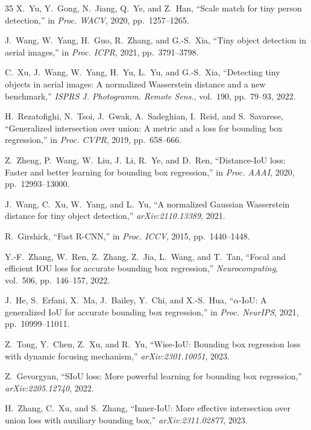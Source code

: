 \documentclass[11pt,a4paper]{article}
\begin{document}
\begin{thebibliography}{35}
  \small
  X.~Yu, Y.~Gong, N.~Jiang, Q.~Ye, and Z.~Han, ``Scale match for tiny person detection,'' in \emph{Proc. WACV}, 2020, pp.~1257--1265.

  J.~Wang, W.~Yang, H.~Guo, R.~Zhang, and G.-S.~Xia, ``Tiny object detection in aerial images,'' in \emph{Proc. ICPR}, 2021, pp.~3791--3798.

  C.~Xu, J.~Wang, W.~Yang, H.~Yu, L.~Yu, and G.-S.~Xia, ``Detecting tiny objects in aerial images: A normalized Wasserstein distance and a new benchmark,'' \emph{ISPRS J. Photogramm. Remote Sens.}, vol.~190, pp.~79--93, 2022.

  H.~Rezatofighi, N.~Tsoi, J.~Gwak, A.~Sadeghian, I.~Reid, and S.~Savarese, ``Generalized intersection over union: A metric and a loss for bounding box regression,'' in \emph{Proc. CVPR}, 2019, pp.~658--666.

  Z.~Zheng, P.~Wang, W.~Liu, J.~Li, R.~Ye, and D.~Ren, ``Distance-IoU loss: Faster and better learning for bounding box regression,'' in \emph{Proc. AAAI}, 2020, pp.~12993--13000.

  J.~Wang, C.~Xu, W.~Yang, and L.~Yu, ``A normalized Gaussian Wasserstein distance for tiny object detection,'' \emph{arXiv:2110.13389}, 2021.

  R.~Girshick, ``Fast R-CNN,'' in \emph{Proc. ICCV}, 2015, pp.~1440--1448.

  Y.-F.~Zhang, W.~Ren, Z.~Zhang, Z.~Jia, L.~Wang, and T.~Tan, ``Focal and efficient IOU loss for accurate bounding box regression,'' \emph{Neurocomputing}, vol.~506, pp.~146--157, 2022.

  J.~He, S.~Erfani, X.~Ma, J.~Bailey, Y.~Chi, and X.-S.~Hua, ``$\alpha$-IoU: A generalized IoU for accurate bounding box regression,'' in \emph{Proc. NeurIPS}, 2021, pp.~10999--11011.

  Z.~Tong, Y.~Chen, Z.~Xu, and R.~Yu, ``Wise-IoU: Bounding box regression loss with dynamic focusing mechanism,'' \emph{arXiv:2301.10051}, 2023.

  Z.~Gevorgyan, ``SIoU loss: More powerful learning for bounding box regression,'' \emph{arXiv:2205.12740}, 2022.

  H.~Zhang, C.~Xu, and S.~Zhang, ``Inner-IoU: More effective intersection over union loss with auxiliary bounding box,'' \emph{arXiv:2311.02877}, 2023.


\end{thebibliography}
\end{document}
